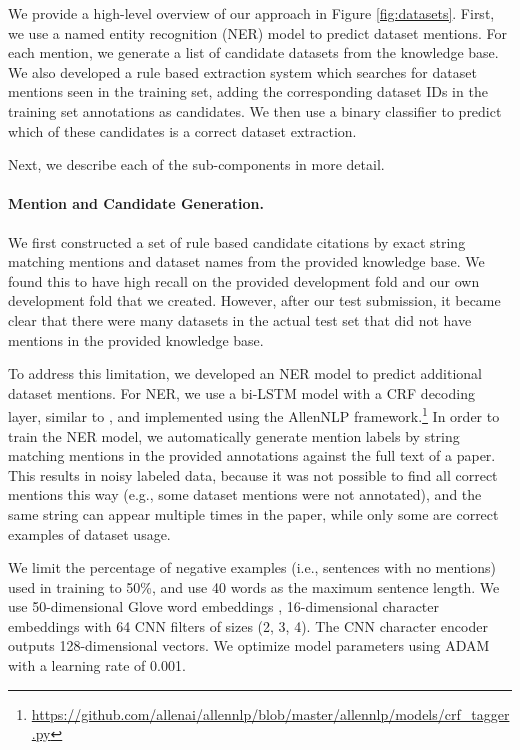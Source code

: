 We provide a high-level overview of our approach in Figure \ref{fig:datasets}.
First, we use a named entity recognition (NER) model to predict dataset mentions. 
For each mention, we generate a list of candidate datasets from the knowledge base. 
We also developed a rule based extraction system which searches for dataset mentions seen in the training set, adding the corresponding dataset IDs in the training set annotations as candidates.
We then use a binary classifier to predict which of these candidates is a correct dataset extraction.

Next, we describe each of the sub-components in more detail.

\paragraph{Mention and Candidate Generation.}
We first constructed a set of rule based candidate citations by exact string matching mentions and dataset names from the provided knowledge base. We found this to have high recall on the provided development fold and our own development fold that we created. However, after our test submission, it became clear that there were many datasets in the actual test set that did not have mentions in the provided knowledge base.

To address this limitation, we developed an NER model to predict additional dataset mentions.
For NER, we use a bi-LSTM model with a CRF decoding layer, similar to \cite{Peters2018DEEPCW}, and implemented using the AllenNLP framework.\footnote{\url{https://github.com/allenai/allennlp/blob/master/allennlp/models/crf_tagger.py}}
In order to train the NER model, we automatically generate mention labels by string matching mentions in the provided annotations against the full text of a paper.
This results in noisy labeled data, because it was not possible to find all correct mentions this way (e.g., some dataset mentions were not annotated), and the same string can appear multiple times in the paper, while only some are correct examples of dataset usage.

We limit the percentage of negative examples (i.e., sentences with no mentions) used in training to 50\%, and use 40 words as the maximum sentence length.
We use 50-dimensional Glove word embeddings \cite{Pennington2014GloveGV}, 16-dimensional character embeddings with 64 CNN filters of sizes (2, 3, 4).
The CNN character encoder outputs 128-dimensional vectors.
We optimize model parameters using ADAM \cite{Kingma2014AdamAM} with a learning rate of 0.001.

